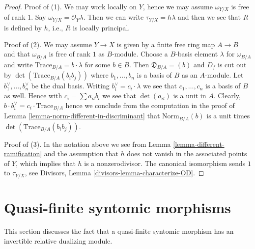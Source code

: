 \documentclass{stacks-project}
\theoremstyle{plain}
\theoremstyle{definition}
\theoremstyle{remark}
\numberwithin{equation}{subsection}
\begin{document}
\begin{proof}
Proof of (1). We may work locally on $Y$, hence we may assume
$\omega_{Y/X}$ is free of rank $1$. Say $\omega_{Y/X} = \mathcal{O}_Y\lambda$.
Then we can write $\tau_{Y/X} = h \lambda$ and then we see that
$R$ is defined by $h$, i.e., $R$ is locally principal.

\medskip\noindent
Proof of (2). We may assume $Y \to X$ is given by a finite free ring
map $A \to B$ and that $\omega_{B/A}$ is free of rank $1$ as $B$-module.
Choose a $B$-basis element $\lambda$ for $\omega_{B/A}$ and write
$\text{Trace}_{B/A} = b \cdot \lambda$ for some $b \in B$.
Then $\mathfrak{D}_{B/A} = (b)$ and $D_f$ is cut out by
$\det(\text{Trace}_{B/A}(b_ib_j))$ where $b_1, \ldots, b_n$ is a
basis of $B$ as an $A$-module. Let $b_1^\vee, \ldots, b_n^\vee$
be the dual basis.
Writing $b_i^\vee = c_i \cdot \lambda$ we see that
$c_1, \ldots, c_n$ is a basis of $B$ as well.
Hence with $c_i = \sum a_{il}b_l$ we see that $\det(a_{il})$
is a unit in $A$. Clearly,
$b \cdot b_i^\vee = c_i \cdot \text{Trace}_{B/A}$
hence we conclude from the computation in the proof of
Lemma \ref{lemma-norm-different-in-discriminant}
that $\text{Norm}_{B/A}(b)$ is a unit times
$\det(\text{Trace}_{B/A}(b_ib_j))$.

\medskip\noindent
Proof of (3). In the notation above we see from
Lemma \ref{lemma-different-ramification} and the assumption
that $h$ does not vanish in
the associated points of $Y$, which implies that $h$ is a nonzerodivisor.
The canonical isomorphism sends $1$ to $\tau_{Y/X}$, see
Divisors, Lemma \ref{divisors-lemma-characterize-OD}.
\end{proof}







\section{Quasi-finite syntomic morphisms}
\label{section-quasi-finite-syntomic}

\noindent
This section discusses the fact that a quasi-finite syntomic morphism
has an invertible relative dualizing module.
\end{document}

